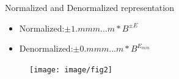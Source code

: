 \documentclass[11pt]{beamer}
\begin{document}
\begin{frame}{Normalized and Denormalized representation}
\begin{itemize}
\item Normalized:$\pm{1.mmm...m}*B^{\pm{E}}$\\
\item Denormalized:$\pm{0.mmm...m}*B^{E_{min}}$
\end{itemize}
\begin{center}
    \begin{figure}[htp]
    \begin{center}
     \texttt{[image: image/fig2]}
    \end{center}
    \label{reffig2}
    \end{figure}
\end{center}
\end{frame}
\end{document}
